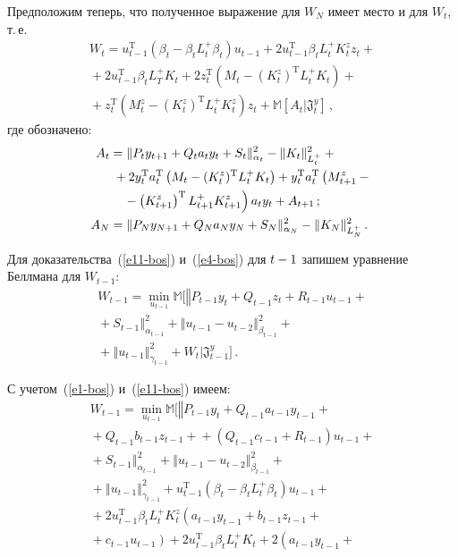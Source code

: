 \begin{multicols}{2}
 Предположим теперь, что полученное выражение для $W_N$ имеет
место и для $W_t$, т.\,е.
 \begin{multline}
 W_t = u^{\mathrm{T}}_{t-1} (\beta_t -\beta_t L_t^+ \beta_t) u_{t-1} +
 2u^{\mathrm{T}}_{t-1} \beta_t L_t^+ K_t^z z_t +{}\\
 {}+2u^{\mathrm{T}}_{t-1} \beta_t L_T^+ K_t+
 2z_t^{\mathrm{T}} \left(M_t -(K_t^z)^{\mathrm{T}} L_t^+ K_t\right) +{}\\
 {}+
 z_t^{\mathrm{T}}\left(M_t^z-\left(K_t^z\right)^{\mathrm{T}} L_t^+
K_t^z\right)z_t +\mathbb{M} \left[ A_t\Big\vert \mathfrak{J}_t^y\right]\,,
 \label{e11-bos}
 \end{multline}
где обозначено:
\begin{align*}
A_t &= \| P_t y_{t+1} +Q_t a_t y_t +S_t\|^2_{\alpha_t} -
\|K_t\|^2_{L_t^+}+{}\\
&\hspace*{1mm}{}+ 2y_t^{\mathrm{T}} a_t^{\mathrm{T}}
\left(M_t-(K_t^z)^{\mathrm{T}} L_t^+ K_t\right) +
y_t^{\mathrm{T}} a_t^{\mathrm{T}} \left(M^z_{t+1} -{}\right.\\
&\hspace*{3mm}\left.{}-\left(K^z_{t+1}\right)^{\mathrm{T}} L^+_{t+1} K^z_{t+1}\right) a_t y_t +A_{t+1}\,;\\
A_N&= \| P_N y_{N+1} +Q_N a_N y_N +S_N \|^2_{\alpha_N} -
\|K_N\|^2_{L^+_N}\,.
\end{align*}

 Для доказательства~(\ref{e11-bos}) и~(\ref{e4-bos}) для $t\hm-1$ запишем
уравнение Беллмана для $W_{t-1}$:
 \begin{multline*}
 W_{t-1} = %
\min\limits_{u_{t-1}} \mathbb{M}\Big[ \left\Vert P_{t-1} y_t +
Q_{t-1} z_t + R_{t-1} u_{t-1} +{}\right.\\
\left.{}+ S_{t-1} \right\Vert^2_{\alpha_{t-1}} +
\left\Vert u_{t-1} - u_{t-2} \right\Vert^2_{\beta_{t-1}} +{}\\
{}+
 \left\Vert u_{t-1}\right\Vert^2_{\gamma_{t-1}} +
 W_t \Big\vert \mathfrak{J}_{t-1}^y  \Big]\,.
 \end{multline*}

С учетом~(\ref{e1-bos}) и~(\ref{e11-bos}) имеем:
\begin{multline*}
W_{t-1} = \min\limits_{u_{t-1}} \mathbb{M} \Big[\!
 \left\Vert P_{t-1} y_t + Q_{t-1}a_{t-1} y_{t-1} +{}\right.\\[1pt]
 {}+
 Q_{t-1} b_{t-1} z_{t-1}+ {}+\left(Q_{t-1} c_{t-1} +
R_{t-1}\right) u_{t-1} + {}\\[1pt]
\left.{}+S_{t-1} \right\Vert^2_{\alpha_{t-1}} +
\left\Vert u_{t-1} - u_{t-2} \right\Vert^2_{\beta_{t-1}} +{}\\[1pt]
{}+
\left\Vert u_{t-1}\right\Vert^2_{\gamma_{t-1}} +
u_{t-1}^{\mathrm{T}}\left( \beta_t - \beta_t L_t^+ \beta_t \right)u_{t-1} + {}\\[1pt]
{}+2 u_{t-1}^{\mathrm{T}} \beta_t L_t^+ K_t^z \left( a_{t-1} y_{t-1} +
b_{t-1} z_{t-1} +{}\right.\\[1pt]
\left.{}+
c_{t-1} u_{t-1} \right) + 2 u_{t-1}^{\mathrm{T}} \beta_t L_t^+ K_t +
2\left( a_{t-1} y_{t-1} +{}\right.
\end{multline*}


\end{multicols}
